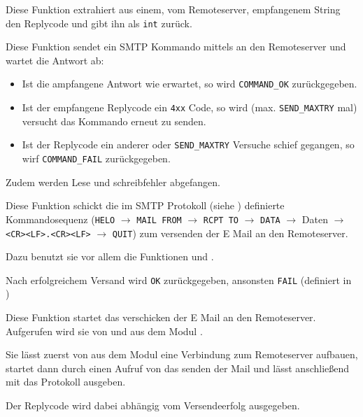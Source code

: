 \label{fn:extract_status}
Diese Funktion extrahiert aus einem, vom Remoteserver, empfangenem String den Replycode und gibt ihn als \texttt{int} zur\"{u}ck.

\label{fn:try_command}
Diese Funktion sendet ein SMTP Kommando mittels  an den Remoteserver und wartet die Antwort ab: 
\begin{itemize}
  \item Ist die ampfangene Antwort wie erwartet, so wird \texttt{COMMAND\_OK} zur\"{u}ckgegeben. 
  \item Ist der empfangene Replycode ein \texttt{4xx} Code, so wird (max. \texttt{SEND\_MAXTRY} mal) versucht das Kommando erneut zu senden. 
  \item Ist der Replycode ein anderer oder \texttt{SEND\_MAXTRY} Versuche schief gegangen, so wirf \texttt{COMMAND\_FAIL} zur\"{u}ckgegeben.
\end{itemize}
Zudem werden Lese und schreibfehler abgefangen.


\label{fn:send_mail}
Diese Funktion schickt die im SMTP Protokoll (siehe ) definierte Kommandosequenz (\texttt{HELO} $\rightarrow$ \texttt{MAIL FROM} $\rightarrow$ \texttt{RCPT TO} $\rightarrow$ \texttt{DATA} $\rightarrow$ Daten $\rightarrow$ \texttt{<CR><LF>.<CR><LF>} $\rightarrow$ \texttt{QUIT}) zum versenden der E Mail an den Remoteserver.

Dazu benutzt sie vor allem die Funktionen  und .

Nach erfolgreichem Versand wird \texttt{OK} zur\"{u}ckgegeben, ansonsten \texttt{FAIL} (definiert in )

\label{fn:forward_mail}
Diese Funktion startet das verschicken der E Mail an den Remoteserver. Aufgerufen wird sie von  und  aus dem Modul .

Sie l\"{a}sst zuerst von  aus dem Modul  eine Verbindung zum Remoteserver aufbauen, startet dann durch einen Aufruf von  das senden der Mail und l\"{a}sst anschließend mit  das Protokoll ausgeben. 

Der Replycode wird dabei abh\"{a}ngig vom Versendeerfolg ausgegeben.




